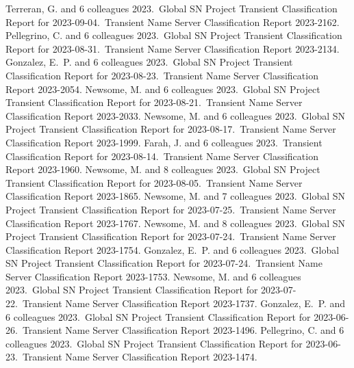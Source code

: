 \documentclass[margin,line]{res}
\begin{document}
\begin{resume}
 Terreran, G. and 6 colleagues 2023.\ Global SN Project Transient Classification Report for 2023-09-04.\ Transient Name Server Classification Report 2023-2162.
 Pellegrino, C. and 6 colleagues 2023.\ Global SN Project Transient Classification Report for 2023-08-31.\ Transient Name Server Classification Report 2023-2134.
 Gonzalez, E.~P. and 6 colleagues 2023.\ Global SN Project Transient Classification Report for 2023-08-23.\ Transient Name Server Classification Report 2023-2054.
 Newsome, M. and 6 colleagues 2023.\ Global SN Project Transient Classification Report for 2023-08-21.\ Transient Name Server Classification Report 2023-2033.
 Newsome, M. and 6 colleagues 2023.\ Global SN Project Transient Classification Report for 2023-08-17.\ Transient Name Server Classification Report 2023-1999.
 Farah, J. and 6 colleagues 2023.\ Transient Classification Report for 2023-08-14.\ Transient Name Server Classification Report 2023-1960.
 Newsome, M. and 8 colleagues 2023.\ Global SN Project Transient Classification Report for 2023-08-05.\ Transient Name Server Classification Report 2023-1865.
 Newsome, M. and 7 colleagues 2023.\ Global SN Project Transient Classification Report for 2023-07-25.\ Transient Name Server Classification Report 2023-1767.
 Newsome, M. and 8 colleagues 2023.\ Global SN Project Transient Classification Report for 2023-07-24.\ Transient Name Server Classification Report 2023-1754.
 Gonzalez, E.~P. and 6 colleagues 2023.\ Global SN Project Transient Classification Report for 2023-07-24.\ Transient Name Server Classification Report 2023-1753.
 Newsome, M. and 6 colleagues 2023.\ Global SN Project Transient Classification Report for 2023-07-22.\ Transient Name Server Classification Report 2023-1737.
 Gonzalez, E.~P. and 6 colleagues 2023.\ Global SN Project Transient Classification Report for 2023-06-26.\ Transient Name Server Classification Report 2023-1496.
 Pellegrino, C. and 6 colleagues 2023.\ Global SN Project Transient Classification Report for 2023-06-23.\ Transient Name Server Classification Report 2023-1474.

\end{resume}
\end{document}
